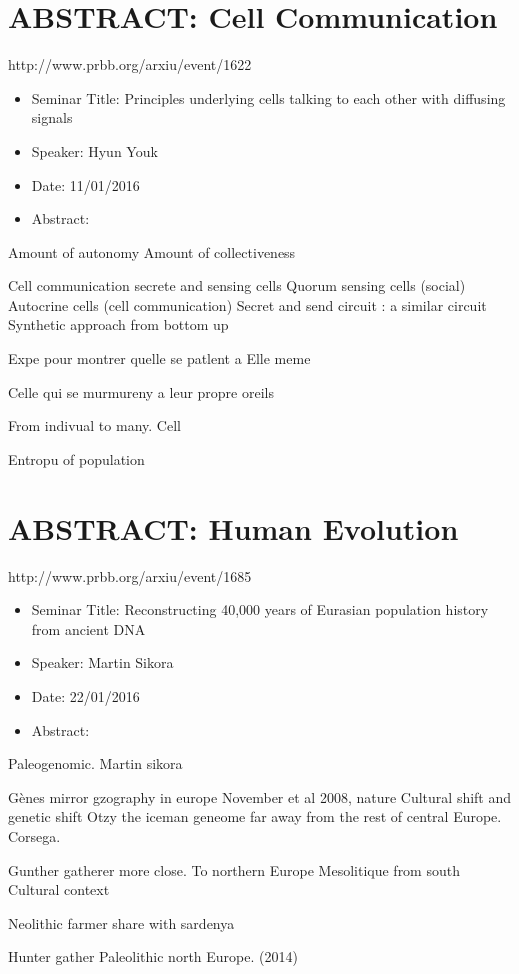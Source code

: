\documentclass[10pt,letterpaper]{article}
\begin{document}
\section{ABSTRACT: Cell Communication}
http://www.prbb.org/arxiu/event/1622
\begin{itemize}
    \item Seminar Title: Principles underlying cells talking to each other with diffusing signals
    \item Speaker: Hyun Youk
    \item Date: 11/01/2016
    \item Abstract:
\end{itemize}


Amount of autonomy
Amount of collectiveness

Cell communication secrete and sensing cells
Quorum sensing cells (social)
Autocrine cells (cell communication)
Secret and send circuit : a similar circuit
Synthetic approach from bottom up

Expe pour montrer quelle se patlent a Elle meme

Celle qui se murmureny a leur propre oreils

From indivual to many. Cell

Entropu of population


\section{ABSTRACT: Human Evolution}
http://www.prbb.org/arxiu/event/1685

\begin{itemize}
    \item Seminar Title: Reconstructing 40,000 years of Eurasian population history from ancient DNA
    \item Speaker: Martin Sikora
    \item Date: 22/01/2016
    \item Abstract: 
\end{itemize}
Paleogenomic. Martin sikora

Gènes mirror gzography in europe
November et al 2008, nature
Cultural shift and genetic shift
Otzy the iceman geneome far away from the rest of central Europe.
Corsega.

Gunther gatherer more close. To northern Europe
Mesolitique from south
Cultural context

Neolithic farmer share with sardenya

Hunter gather Paleolithic north Europe.
(2014)
\end{document}
